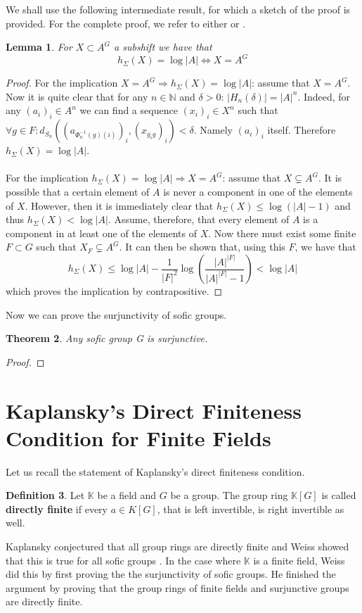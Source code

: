 \documentclass[titlepage, a4paper]{article}
\newcommand{\N}{\mathbb{N}}
\theoremstyle{theoremdd}
\newtheorem{theorem}{Theorem}[section]
\newtheorem{lemma}[theorem]{Lemma}
\theoremstyle{definition}
\newtheorem{definition}[theorem]{Definition}
\theoremstyle{remark}
\begin{document}
We shall use the following intermediate result, for which a sketch of the proof is provided. For the complete proof, we refer to either \cite[paragraph 2.13.7]{capraro_lupini_2015} or \cite[theorem 4.12]{kerr_li_2010}.

\begin{lemma}
For $X \subset A^G$ a subshift we have that 
		\[
		h_\Sigma(X) = \log |A| \Leftrightarrow X = A^G
		\]
\end{lemma}
\begin{proof}
For the implication $X = A^G \Rightarrow h_\Sigma(X) = \log |A|$: assume that $X = A^G$. Now it is quite clear that for any $n \in \N$ and $\delta > 0$: $|H_n(\delta)| = |A|^n$. Indeed, for any $(a_i)_i \in A^n$ we can find a sequence $(x_i)_i \in X^n$ such that $\forall g \in F: d_{S_n}((a_{\Phi^{-1}_n(g)(i)})_i,(x_{g_i g})_i) < \delta$. Namely  $(a_i)_i$ itself. Therefore $h_\Sigma(X) = \log |A|$.\\
\\
For the implication $h_\Sigma(X) = \log |A| \Rightarrow X = A^G$: assume that $X \varsubsetneq A^G$. It is possible that a certain element of $A$ is never a component in one of the elements of $X$. However, then it is immediately clear that $h_\Sigma(X) \leq \log (|A|-1) $ and thus $h_\Sigma(X) < \log |A|$. Assume, therefore, that every element of $A$ is a component in at least one of the elements of $X$. Now there must exist some finite $F \subset G$ such that $X_F \varsubsetneq A^G$. It can then be shown that, using this $F$, we have that
		\[
		h_\Sigma(X) \leq \log |A| - \frac{1}{|F|^2} \log \left(\frac{|A|^{|F|}}{|A|^{|F|} - 1}\right) < \log |A|
		\]
which proves the implication by contrapositive. 
\end{proof}

Now we can prove the surjunctivity of sofic groups.

\begin{theorem}
Any sofic group G is surjunctive.
\end{theorem}
\begin{proof}

\end{proof}

	\section{Kaplansky's Direct Finiteness Condition for Finite Fields}
	Let us recall the statement of Kaplansky's direct finiteness condition.
	\begin{definition}
		Let $\mathbb K$ be a field and $G$ be a group. The group ring $\mathbb K[G]$ is called \textbf{directly finite} if every  $a \in K[G]$, that is left invertible, is right invertible as well. 
		
	\end{definition}
	Kaplansky conjectured that all group rings are directly finite and Weiss showed that this is true for all sofic groups \cite[section 3, section 4]{weiss_2000}. 
	In the case where $\mathbb K$ is a finite field, Weiss did this by first proving the the surjunctivity of sofic groups.
	He finished the argument by proving that the group rings of finite fields and surjunctive groups are directly finite.  
\end{document}
